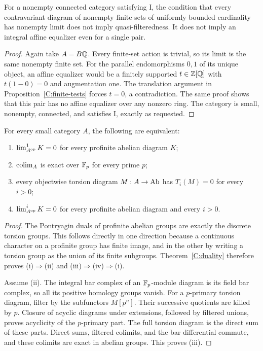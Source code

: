 \begin{proposition}\label{C:bounded-tests}
For a nonempty connected category satisfying I, the condition that every contravariant diagram of nonempty finite sets of uniformly bounded cardinality has nonempty limit does not imply quasi-filteredness. It does not imply an integral affine equalizer even for a single pair.
\end{proposition}
\begin{proof}
Again take $A=B\mathbb Q$. Every finite-set action is trivial, so its limit is the same nonempty finite set. For the parallel endomorphisms $0,1$ of its unique object, an affine equalizer would be a finitely supported $t\in\mathbb Z[\mathbb Q]$ with $t(1-0)=0$ and augmentation one. The translation argument in Proposition~\ref{C:finite-tests} forces $t=0$, a contradiction. The same proof shows that this pair has no affine equalizer over any nonzero ring. The category is small, nonempty, connected, and satisfies I, exactly as requested.
\end{proof}

\begin{theorem}\label{C:profinite}
For every small category $A$, the following are equivalent:
\begin{enumerate}[label=(\roman*)]
\item $\lim^1_{A^{\mathrm{op}}}K=0$ for every profinite abelian diagram $K$;
\item $\operatorname*{colim}_A$ is exact over $\mathbb F_p$ for every prime $p$;
\item every objectwise torsion diagram $M:A\to\mathrm{Ab}$ has $T_i(M)=0$ for every $i>0$;
\item $\lim^i_{A^{\mathrm{op}}}K=0$ for every profinite abelian diagram and every $i>0$.
\end{enumerate}
\end{theorem}
\begin{proof}
The Pontryagin duals of profinite abelian groups are exactly the discrete torsion groups. This follows directly in one direction because a continuous character on a profinite group has finite image, and in the other by writing a torsion group as the union of its finite subgroups. Theorem~\ref{C:duality} therefore proves (i)$\Rightarrow$(ii) and (iii)$\Rightarrow$(iv)$\Rightarrow$(i).

Assume (ii). The integral bar complex of an $\mathbb F_p$-module diagram is its field bar complex, so all its positive homology groups vanish. For a $p$-primary torsion diagram, filter by the subfunctors $M[p^n]$. Their successive quotients are killed by $p$. Closure of acyclic diagrams under extensions, followed by filtered unions, proves acyclicity of the $p$-primary part. The full torsion diagram is the direct sum of these parts. Direct sums, filtered colimits, and the bar differential commute, and these colimits are exact in abelian groups. This proves (iii).
\end{proof}

